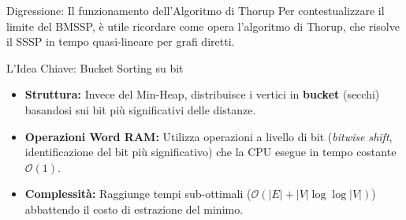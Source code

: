 \documentclass[aspectratio=169]{beamer}
\begin{document}
\begin{frame}{Digressione: Il funzionamento dell'Algoritmo di Thorup}
    Per contestualizzare il limite del BMSSP, è utile ricordare come opera l'algoritmo di Thorup, che risolve il SSSP in tempo quasi-lineare per grafi diretti.
    \vspace{0.1cm}
    
    \begin{block}{L'Idea Chiave: Bucket Sorting su bit}
        \small
        \begin{itemize}
            \setlength{\itemsep}{0.1cm} 
            \item \textbf{Struttura:} Invece del Min-Heap, distribuisce i vertici in \textbf{bucket} (secchi) basandosi sui bit più significativi delle distanze.
            \item \textbf{Operazioni Word RAM:} Utilizza operazioni a livello di bit (\textit{bitwise shift}, identificazione del bit più significativo) che la CPU esegue in tempo costante $\mathcal{O}(1)$.
            \item \textbf{Complessità:} Raggiunge tempi sub-ottimali ($\mathcal{O}(|E| + |V| \log \log |V|)$) abbattendo il costo di estrazione del minimo.
        \end{itemize}
    \end{block}
    
\end{frame}
\end{document}
